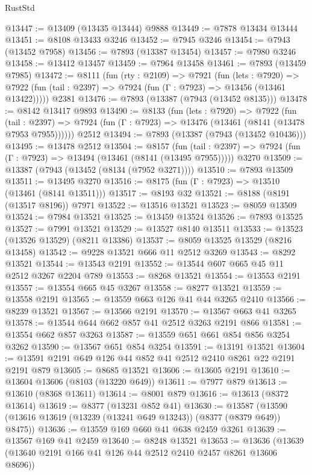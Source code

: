 \begin{lexlean}{RustStd}
\begin{coremodule}
{\begin{coremodule}
{{{{{{{{{{{{{{{{{{{{{{{{{{{{{{{{{{{{{{{{{{{{{{{{{{@13447 := @13409 (@13435 @13444) @9888
@13449 := @7878 @13434 @13444
@13451 := @8108 @13433 @3246
@13452 := @7945 @3246
@13454 := @7943 (@13452 @7958)
@13456 := @7893 (@13387 @13454)
@13457 := @7980 @3246
@13458 := @13412 @13457
@13459 := @7964 @13458
@13461 := @7893 (@13459 @7985)
@13472 := @8111
    (fun (rty : @2109) =>
    @7921
      (fun (lets : @7920) =>
      @7922 (fun (tail : @2397) => @7924 (fun (Γ : @7923) => @13456 (@13461 @13422)))))
    @2381
@13476 := @7893 (@13387 (@7943 (@13452 @8135)))
@13478 := @8142 @13417 @9893
@13490 := @8133
    (fun (lets : @7920) =>
    @7922
      (fun (tail : @2397) =>
      @7924 (fun (Γ : @7923) => @13476 (@13461 (@8141 (@13478 @7953 @7955))))))
    @2512
@13494 := @7893 (@13387 (@7943 (@13452 @10436)))
@13495 := @13478 @2512
@13504 := @8157
    (fun (tail : @2397) => @7924 (fun (Γ : @7923) => @13494 (@13461 (@8141 (@13495 @7955)))))
    @3270
@13509 := @13387 (@7943 (@13452 (@8134 (@7952 @3271))))
@13510 := @7893 @13509
@13511 := @13495 @3270
@13516 := @8175 (fun (Γ : @7923) => @13510 (@13461 (@8141 @13511)))
@13517 := @8193 @32
@13521 := @8188 (@8191 (@13517 @8196)) @7971
@13522 := @13516 @13521
@13523 := @8059 @13509
@13524 := @7984 @13521
@13525 := @13459 @13524
@13526 := @7893 @13525
@13527 := @7991 @13521
@13529 := @13527 @8140 @13511
@13533 := @13523 (@13526 @13529) (@8211 @13386)
@13537 := @8059 @13525 @13529 (@8216 @13458)
@13542 := @9228 @13521 @666 @11 @2512 @3269
@13543 := @8292 @13521
@13544 := @13543 @2191
@13552 := @13544 @607 @665 @45 @11 @2512 @3267 @2204 @789
@13553 := @8268 @13521
@13554 := @13553 @2191
@13557 := @13554 @665 @45 @3267
@13558 := @8277 @13521
@13559 := @13558 @2191
@13565 := @13559 @663 @126 @41 @44 @3265 @2410
@13566 := @8239 @13521
@13567 := @13566 @2191
@13570 := @13567 @663 @41 @3265
@13578 := @13544 @644 @662 @857 @41 @2512 @3263 @2191 @866
@13581 := @13554 @662 @857 @3263
@13587 := @13559 @651 @661 @854 @856 @3254 @3262
@13590 := @13567 @651 @854 @3254
@13591 := @13191 @13521
@13604 := @13591 @2191 @649 @126 @44 @852 @41 @2512 @2410 @8261 @22 @2191 @2191 @879
@13605 := @8685 @13521
@13606 := @13605 @2191
@13610 := @13604 @13606 (@8103 (@13220 @649))
@13611 := @7977 @879
@13613 := @13610 (@8368 @13611)
@13614 := @8001 @879
@13616 := @13613 (@8372 @13614)
@13619 := @8377 (@13231 @852 @41)
@13630 := @13587 (@13590 (@13616 @13619 (@13239 (@13241 @649 @13243)) (@8377 (@8379 @649)) @8475))
@13636 := @13559 @169 @660 @41 @638 @2459 @3261
@13639 := @13567 @169 @41 @2459
@13640 := @8248 @13521
@13653 := @13636 (@13639 (@13640 @2191 @166 @41 @126 @44 @2512 @2410 @2457 @8261 @13606 @8696))
}}}}}}}}}}}}}}}}}}}}}}}}}}}}}}}}}}}}}}}}}}}}}}}}}}
\end{coremodule}}
\end{coremodule}
\end{lexlean}
